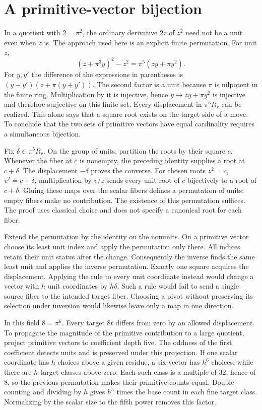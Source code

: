 \documentclass[12pt,letterpaper]{article}
\begin{document}
\section{A primitive-vector bijection}
In a quotient with $2=\pi^2$, the ordinary derivative $2z$ of $z^2$ need not be a unit even when $z$ is. The approach used here is an explicit finite permutation. For unit $z$,
\[
       (z+\pi^3y)^2-z^2=\pi^5(zy+\pi y^2).
\]
For $y,y'$ the difference of the expressions in parentheses is $(y-y')(z+\pi(y+y'))$. The second factor is a unit because $\pi$ is nilpotent in the finite ring. Multiplication by it is injective, hence $y\mapsto zy+\pi y^2$ is injective and therefore surjective on this finite set. Every displacement in $\pi^5R_r$ can be realized. This alone says that a square root exists on the target side of a move. To conclude that the two sets of primitive vectors have equal cardinality requires a simultaneous bijection.

Fix $\delta\in\pi^5R_r$. On the group of units, partition the roots by their square $c$. Whenever the fiber at $c$ is nonempty, the preceding identity supplies a root at $c+\delta$. The displacement $-\delta$ proves the converse. For chosen roots $z^2=c$, $v^2=c+\delta$, multiplication by $v/z$ sends every unit root of $c$ bijectively to a root of $c+\delta$. Gluing these maps over the scalar fibers defines a permutation of units; empty fibers make no contribution. The existence of this permutation suffices. The proof uses classical choice and does not specify a canonical root for each fiber.

Extend the permutation by the identity on the nonunits. On a primitive vector choose its least unit index and apply the permutation only there. All indices retain their unit status after the change. Consequently the inverse finds the same least unit and applies the inverse permutation. Exactly one square acquires the displacement. Applying the rule to every unit coordinate instead would change a vector with $h$ unit coordinates by $h\delta$. Such a rule would fail to send a single source fiber to the intended target fiber. Choosing a pivot without preserving its selection under inversion would likewise leave only a map in one direction.

In this field $8=\pi^6$. Every target $8t$ differs from zero by an allowed displacement. To propagate the magnitude of the primitive contribution to a large quotient, project primitive vectors to coefficient depth five. The oddness of the first coefficient detects units and is preserved under this projection. If one scalar coordinate has $h$ choices above a given residue, a six-vector has $h^6$ choices, while there are $h$ target classes above zero. Each such class is a multiple of $32$, hence of $8$, so the previous permutation makes their primitive counts equal. Double counting and dividing by $h$ gives $h^5$ times the base count in each fine target class. Normalizing by the scalar size to the fifth power removes this factor.
\end{document}
